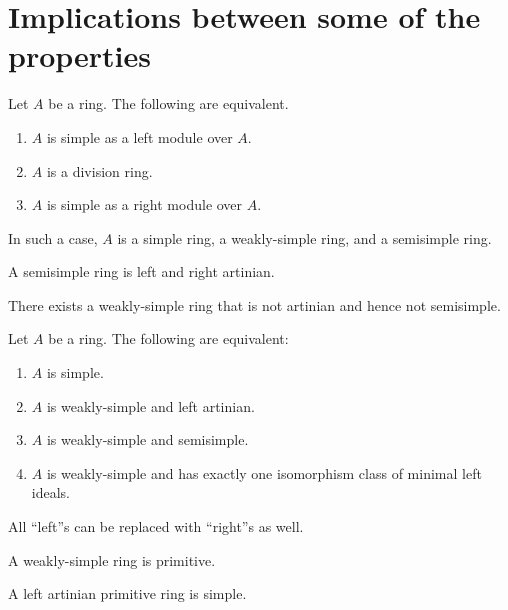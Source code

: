 \documentclass[12pt]{article}
\begin{document}
\section{Implications between some of the properties}

\begin{thm} \label{thm:simple-as-a-module}
	Let $A$ be a ring. The following are equivalent.
	\begin{enumerate}[label=(\alph*)]
		\item $A$ is simple as a left module over $A$.
		\item $A$ is a division ring.
		\item $A$ is simple as a right module over $A$.
	\end{enumerate}
	In such a case, $A$ is a simple ring, a weakly-simple ring, and a semisimple ring.
\end{thm}

\begin{thm} \label{thm:semismimple-implies-artinian}
	A semisimple ring is left and right artinian.
\end{thm}

\begin{thm} \label{thm:weakly-simple-not-semisimple}
	There exists a weakly-simple ring that is not artinian and hence not semisimple.
\end{thm}

\begin{thm} \label{thm:simple-equivalences-with-semisimple}
	Let $A$ be a ring. The following are equivalent:
	\begin{enumerate}[label=(\alph*)]
		\item $A$ is simple.
		\item $A$ is weakly-simple and left artinian.
		\item $A$ is weakly-simple and semisimple.
		\item $A$ is weakly-simple and has exactly one isomorphism class of minimal left ideals.
	\end{enumerate}
	All ``left''s can be replaced with ``right''s as well.
\end{thm}

\begin{thm}
	A weakly-simple ring is primitive.
\end{thm}

\begin{thm}
	A left artinian primitive ring is simple.
\end{thm}
\end{document}
